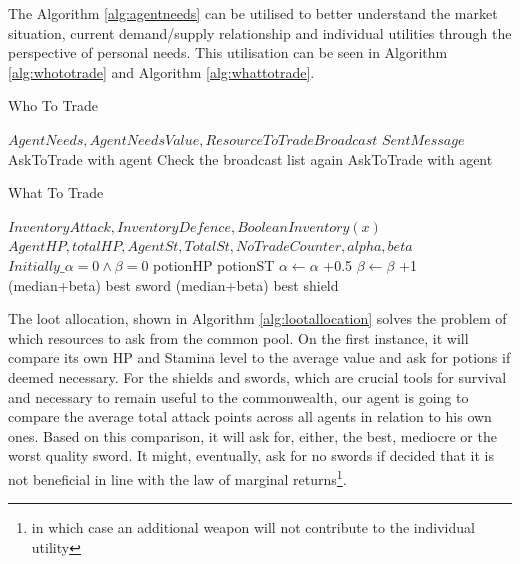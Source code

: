 The Algorithm \ref{alg:agentneeds} can be utilised to better understand the market situation, current demand/supply relationship and individual utilities through the perspective of personal needs. This utilisation can be seen in Algorithm \ref{alg:whototrade} and Algorithm \ref{alg:whattotrade}.

\begin{algorithm}[htb]
\caption{Who To Trade}\label{alg:whototrade}
\begin{algorithmic} 
\scriptsize
\Require $AgentNeeds, AgentNeedsValue, ResourceToTradeBroadcast$
\Require $SentMessage $
\State AskToTrade with agent
\EndIf
{}
\State Check the broadcast list again
\State AskToTrade with agent
\EndIf
\EndIf
\end{algorithmic}
\end{algorithm}

\begin{algorithm}[htb]
\caption{What To Trade}\label{alg:whattotrade}
\begin{algorithmic} 
\scriptsize
\Require $InventoryAttack, InventoryDefence, Boolean Inventory(x)$
\Require $AgentHP, totalHP, AgentSt, TotalSt, NoTradeCounter,alpha, beta$
\Ensure $Initially\_\alpha = 0 \land \beta = 0$
\State 
\Return potionHP
\EndIf
{}
\State 
\Return potionST
\EndIf
{}
\State $\alpha \leftarrow \alpha$ +0.5
\State $\beta \leftarrow \beta$ +1
\EndIf
{}
\State 
\Return (median+beta) best sword 
\EndIf
{}
\State 
\Return (median+beta) best shield 
\EndIf
\end{algorithmic}
\end{algorithm}


The loot allocation, shown in Algorithm \ref{alg:lootallocation} solves the problem of which resources to ask from the common pool. On the first instance, it will compare its own HP and Stamina level to the average value and ask for potions if deemed necessary. For the shields and swords, which are crucial tools for survival and necessary to remain useful to the commonwealth, our agent is going to compare the average total attack points across all agents in relation to his own ones. Based on this comparison, it will ask for, either, the best, mediocre or the worst quality sword. It might, eventually, ask for no swords if decided that it is not beneficial in line with the law of marginal returns\footnote{in which case an additional weapon will not contribute to the individual utility}.

